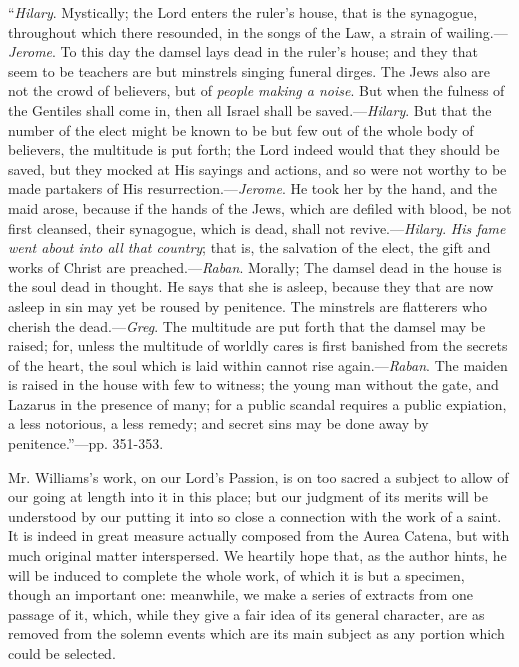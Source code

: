 ``\emph{Hilary}. Mystically; the Lord
enters the ruler's house, that is the synagogue, throughout which there
resounded, in the songs of the Law, a strain of wailing.—\emph{Jerome}.
To this day the damsel lays dead in the ruler's house; and they that
seem to be teachers are but minstrels singing funeral dirges. The Jews
also are not the crowd of believers, but of \emph{people making a noise}.
But when the fulness of the Gentiles shall come in, then all Israel
shall be saved.—\emph{Hilary}. But that the number of the elect might
be known to be but few out of the whole body of believers, the multitude
is put forth; the Lord indeed would that they should be saved,
but they mocked at His sayings and actions, and so were not worthy to be
made partakers of His resurrection.—\emph{Jerome}. He took her by the
hand, and the maid arose, because if the hands of the Jews, which are
defiled with blood, be not first cleansed, their synagogue, which is
dead, shall not revive.—\emph{Hilary}. \emph{His fame went about into all
that country}; that is, the salvation of the elect, the gift and
works of Christ are preached.—\emph{Raban}. Morally; The damsel dead
in the house is the soul dead in thought. He says that she is asleep,
because they that are now asleep in sin may yet be roused by penitence.
The minstrels are flatterers who cherish the dead.—\emph{Greg}. The
multitude are put forth that the damsel may be raised; for, unless the
multitude of worldly cares is first banished from the secrets of the
heart, the soul which is laid within cannot rise again.—\emph{Raban}.
The maiden is raised in the house with few to witness; the young man
without the gate, and Lazarus in the presence of many; for a public
scandal requires a public expiation, a less notorious, a less remedy;
and secret sins may be done away by penitence.''—pp. 351-353.

Mr. Williams's work, on our Lord's Passion, is on
too sacred a subject to allow of our going at length into it in this
place; but our judgment of its merits will be understood by our putting
it into so close a connection with the work of a saint. It is indeed in
great measure actually composed from the Aurea Catena, but with much
original matter interspersed. We heartily hope that, as the author
hints, he will be induced to complete the whole work, of which it is but
a specimen, though an important one: meanwhile, we make a series of
extracts from one passage of it, which, while they give a fair idea of
its general character, are as removed from the solemn events which are
its main subject as any portion which could be selected.

